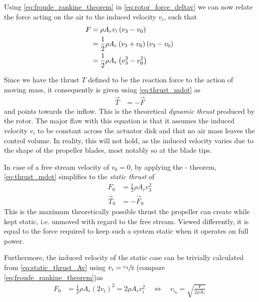 Using \cref{eq:froude_rankine_theorem} in \cref{eq:rotor_force_deltav} we can now relate the force acting on the air to the induced velocity $v_i$, such that
%
\begin{align}
F &= \rho A_r v_i \left(v_3 - v_0\right) \\
  &= \frac{1}{2} \rho A_r \left(v_3 + v_0\right) \left(v_3 - v_0\right) \notag \\
  &= \frac{1}{2} \rho A_r \left(v^2_3 - v^2_0\right) \label{eq:thrust_mdot}
\end{align}

Since we have the thrust $T$ defined to be the reaction force to the action of moving mass, it consequently is given using \cref{eq:thrust_mdot} as
%
\begin{align}
\vec{T} &= -\vec{F} \label{eq:thrust}
\end{align}
%
and points towards the inflow. 
This is the theoretical \textit{dynamic thrust} produced by the rotor. 
The major flaw with this equation is that it assumes the induced velocity $v_i$ to be constant across the actuator disk and that no air mass leaves the control volume.
In reality, this will not hold, as the induced velocity varies due to the shape of the propeller blades, most notably so at the blade tips.


In case of a free stream velocity of $v_0 = 0$, by applying the - theorem, \cref{eq:thrust_mdot} simplifies to the \textit{static thrust} of
%
\begin{align}
F_{0} &= \frac{1}{2} \rho A_r v_3^2 \label{eq:static_thrust_Av} \\
\vec{T}_{0} &= -\vec{F}_{0}
\end{align}
%
This is the maximum theoretically possible thrust the propeller can create while kept static, i.e. unmoved with regard to the free stream. 
Viewed differently, it is equal to the force required to keep such a system static when it operates on full power.


Furthermore, the induced velocity of the static case can be trivially calculated from \cref{eq:static_thrust_Av} using $v_i = \sfrac{v_3}{2}$ (compare \cref{eq:froude_rankine_theorem})as
%
\begin{align}
F_{0} &= \frac{1}{2} \rho A_r (2 v_i)^2 
       = 2 \rho A_r v_i^2 \quad \Leftrightarrow \quad
v_{i_0}   = \sqrt{\frac{F}{2 \rho A_r}}
\end{align}
%

